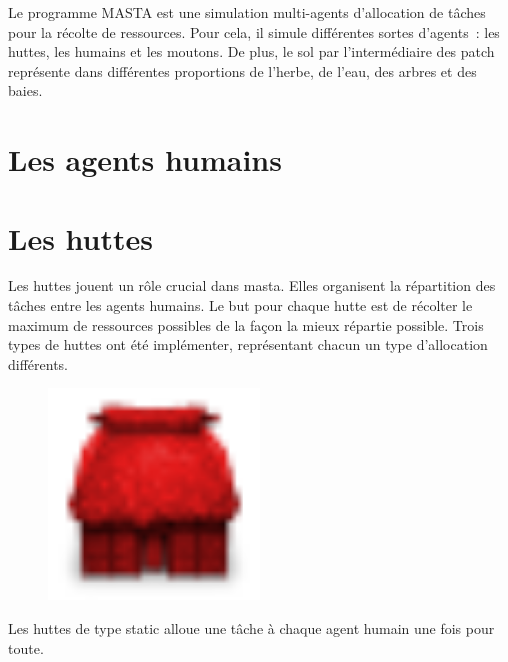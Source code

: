 

Le programme MASTA est une simulation multi-agents d'allocation de
tâches pour la récolte de ressources. Pour cela, il simule différentes
sortes d'agents~: les huttes, les humains et les moutons. De plus, le
sol par l'intermédiaire des \og{}patch\fg{} représente dans
différentes proportions de l'herbe, de l'eau, des arbres et des baies.

\section{Les agents humains}



\section{Les huttes}

Les huttes jouent un rôle crucial dans masta. Elles organisent la
répartition des tâches entre les agents \og{}humains\fg{}. Le but pour
chaque hutte est de récolter le maximum de ressources possibles de la
façon la mieux répartie possible. Trois types de huttes ont été
implémenter, représentant chacun un type d'allocation différents.

\begin{minipage}[H]{0.1\linewidth}
  \begin{figure}[H]
    \begin{center}
      \includegraphics[width=0.5\textwidth]{./img/hut_static}
    \end{center}
  \end{figure}
\end{minipage}
\begin{minipage}[H]{0.9\linewidth}
  Les huttes de type \og{}static\fg{} alloue une tâche à chaque agent
  humain une fois pour toute.
\end{minipage}

